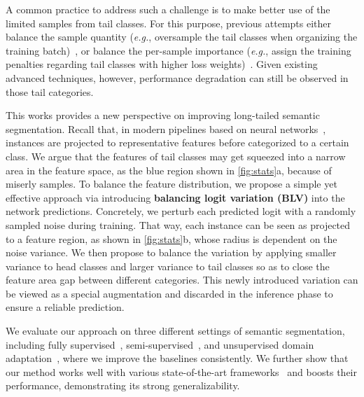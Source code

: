 A common practice to address such a challenge is to make better use of the limited samples from tail classes.
%
For this purpose, previous attempts either balance the sample quantity (\textit{e.g.}, oversample the tail classes when organizing the training batch)~\cite{chawla2002smote, shen2016relay,galar2013eusboost,hao2020annealing,kim2020m2m}, or balance the per-sample importance (\textit{e.g.}, assign the training penalties regarding tail classes with higher loss weights)~\cite{li2021autobalance,park2021influence,cui2019class,ren2018learning}.
%
Given existing advanced techniques, however, performance degradation can still be observed in those tail categories.


This works provides a new perspective on improving long-tailed semantic segmentation.
%
Recall that, in modern pipelines based on neural networks~\cite{fcn, deeplab, xie2021segformer, zhang2021k, zheng2021rethinking, chen2022vision}, instances are projected to representative features before categorized to a certain class.
%
We argue that the features of tail classes may get squeezed into a narrow area in the feature space, as the blue region shown in \cref{fig:stats}a, because of miserly samples.
%
To balance the feature distribution, we propose a simple yet effective approach via introducing \textbf{balancing logit variation (BLV)} into the network predictions.
%
Concretely, we perturb each predicted logit with a randomly sampled noise during training.
%
That way, each instance can be seen as projected to a feature region, as shown in \cref{fig:stats}b, whose radius is dependent on the noise variance.
%
We then propose to balance the variation by applying smaller variance to head classes and larger variance to tail classes so as to close the feature area gap between different categories.
%
This newly introduced variation can be viewed as a special augmentation and discarded in the inference phase to ensure a reliable prediction.


We evaluate our approach on three different settings of semantic segmentation, including fully supervised~\cite{yuan2020object, xiao2018unified, dosovitskiy2020image, pspnet}, semi-supervised~\cite{zou2020pseudoseg, chen2021semi, wang2022semi, zhong2021pixel}, and unsupervised domain adaptation~\cite{du2022learning, li2022class, zhang2021prototypical, zhou2022uncertainty}, where we improve the baselines consistently.
%
We further show that our method works well with various state-of-the-art frameworks~\cite{hoyer2022daformer, hoyer2022hrda, xie2021segformer, zhang2021k, amini2022self, wang2022semi} and boosts their performance, demonstrating its strong generalizability.


